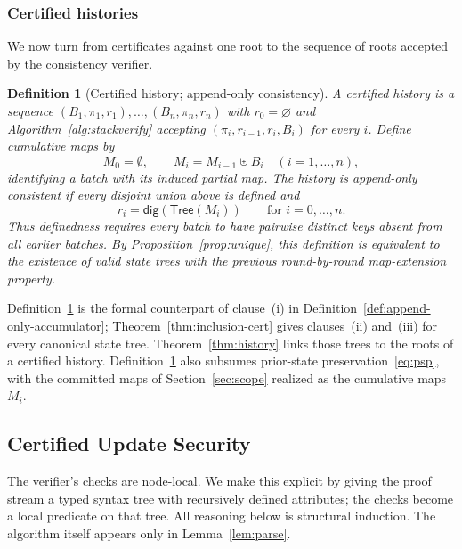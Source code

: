 \documentclass[twocolumn]{article}
\newtheorem{definition}{Definition}
\begin{document}
\subsubsection{Certified histories}

We now turn from certificates against one root to the sequence of roots accepted by the consistency verifier.

\begin{definition}[Certified history; append-only consistency]
\label{def:aoc}
A \emph{certified history} is a sequence $(B_1, \pi_1, r_1), \ldots, (B_n, \pi_n, r_n)$ with $r_0 = \varnothing$ and Algorithm~\ref{alg:stackverify} accepting $(\pi_i, r_{i-1}, r_i, B_i)$ for every $i$. Define cumulative maps by
\[
  M_0 = \emptyset, \qquad M_i = M_{i-1} \uplus B_i \quad (i=1,\ldots,n),
\]
identifying a batch with its induced partial map. The history is \emph{append-only consistent} if every disjoint union above is defined and
\[
  r_i = \mathsf{dig}(\mathsf{Tree}(M_i)) \qquad \text{for } i=0,\ldots,n.
\]
Thus definedness requires every batch to have pairwise distinct keys absent from all earlier batches. By Proposition~\ref{prop:unique}, this definition is equivalent to the existence of valid state trees with the previous round-by-round map-extension property.
\end{definition}

Definition~\ref{def:aoc} is the formal counterpart of clause~(i) in Definition~\ref{def:append-only-accumulator}; Theorem~\ref{thm:inclusion-cert} gives clauses~(ii) and~(iii) for every canonical state tree. Theorem~\ref{thm:history} links those trees to the roots of a certified history. Definition~\ref{def:aoc} also subsumes prior-state preservation~\eqref{eq:psp}, with the committed maps of Section~\ref{sec:scope} realized as the cumulative maps $M_i$.

\subsection{Certified Update Security}
\label{sec:consistency-theorem}

The verifier's checks are node-local. We make this explicit by giving the proof stream a typed syntax tree with recursively defined attributes; the checks become a local predicate on that tree. All reasoning below is structural induction. The algorithm itself appears only in Lemma~\ref{lem:parse}.
\end{document}
